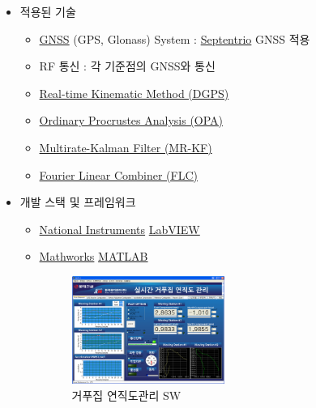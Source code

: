 \begin{itemize}[label=]
\begin{itemize}[label=]
		      \item 적용된 기술
		            \begin{itemize}
			            \item \href{http://gnss.ngii.go.kr/info/summary}{GNSS} (GPS, Glonass) System : \href{http://www.septentrio.com/}{Septentrio} GNSS 적용
			            \item RF 통신 : 각 기준점의 GNSS와 통신
			            \item \href{https://en.wikipedia.org/wiki/Differential_GPS}{Real-time Kinematic Method (DGPS)}
			            \item \href{https://en.wikipedia.org/wiki/Procrustes_analysis}{Ordinary Procrustes Analysis (OPA)}
			            \item \href{http://scholar.lib.vt.edu/theses/available/etd-062899-064821/unrestricted/etd.PDF}{Multirate-Kalman  Filter (MR-KF)}
			            \item \href{http://ieeexplore.ieee.org/xpl/login.jsp?tp=\&arnumber=258116\&url=http\%3A\%2F\%2Fieeexplore.ieee.org\%2Fxpls\%2Fabs_all.jsp\%3Farnumber\%3D258116}{Fourier Linear Combiner (FLC)}
		            \end{itemize}
		      \item 개발 스택 및 프레임워크
		            \begin{itemize}
			            \item \href{https://en.wikipedia.org/wiki/National_Instruments}{National Instruments} \href{https://en.wikipedia.org/wiki/LabVIEW}{LabVIEW}
			            \item \href{https://en.wikipedia.org/wiki/MathWorks}{Mathworks} \href{https://en.wikipedia.org/wiki/MATLAB}{MATLAB}
			                  \begin{figure}[ht]
				                  \begin{fullwidth}
					                  \centering
					                  \parbox{0.5\textwidth}{
						                  \includegraphics[width=0.5\textwidth] {images/gps_01.png}
						                  \caption*{거푸집 연직도관리 SW}
					                  }\qquad

\end{fullwidth}
\end{figure}
\end{itemize}
\end{itemize}
\end{itemize}
